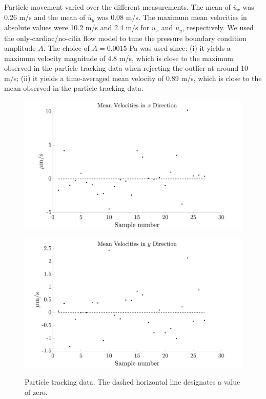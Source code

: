 \documentclass[fleqn]{wlscirep}
\begin{document}
Particle movement varied over the different measurements. The mean of $\overline{u}_x$ was
0.26 \textmu m/s and the mean of $\overline{u}_y$ was 0.08 \textmu m/s. The maximum mean velocities
in absolute values were 10.2 \textmu m/s and 2.4 \textmu m/s for $\overline{u}_x$ and $\overline{u}_y$,
respectively. We used the only-cardiac/no-cilia flow model to tune the pressure boundary condition
amplitude $A$. The choice of $A=0.0015$ Pa was used since: (i) it yields a maximum velocity magnitude
of 4.8 \textmu m/s, which is close to the maximum observed in the particle tracking data when
rejecting the outlier at around 10 \textmu m/s; (ii) it yields a time-averaged mean velocity
of 0.89 \textmu m/s, which is close to the mean observed in the particle tracking data.
\begin{figure}[H]
    \begin{minipage}[t]{0.49\textwidth}
        \includegraphics[width=\textwidth]{graphics/mean_velocities_x.png}
        \label{fig:meanx}
    \end{minipage}
    \begin{minipage}[t]{0.49\textwidth}
        \includegraphics[width=\textwidth]{graphics/mean_velocities_y.png}
        \label{fig:meany}
    \end{minipage} 
    \caption{Particle tracking data. The dashed horizontal line designates a value of zero.}\label{fig:particle_tracking_data}
\end{figure}
\clearpage
{}
\end{document}

